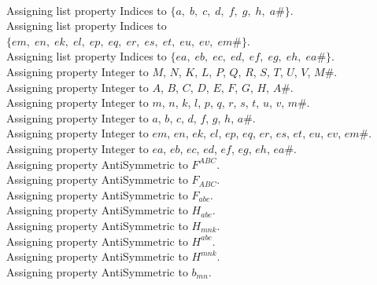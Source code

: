 \documentclass[11pt]{article}
\begin{document}
\\
Assigning list property Indices to $\{a,\; b,\; c,\; d,\; f,\; g,\; h,\; a\#\}$.
\\
Assigning list property Indices to $\{em,\; en,\; ek,\; el,\; ep,\; eq,\; er,\; es,\; et,\; eu,\; ev,\; em\#\}$.
\\
Assigning list property Indices to $\{ea,\; eb,\; ec,\; ed,\; ef,\; eg,\; eh,\; ea\#\}$.
\\
Assigning property Integer to $M$, $N$, $K$, $L$, $P$, $Q$, $R$, $S$, $T$, $U$, $V$, $M\#$.
\\
Assigning property Integer to $A$, $B$, $C$, $D$, $E$, $F$, $G$, $H$, $A\#$.
\\
Assigning property Integer to $m$, $n$, $k$, $l$, $p$, $q$, $r$, $s$, $t$, $u$, $v$, $m\#$.
\\
Assigning property Integer to $a$, $b$, $c$, $d$, $f$, $g$, $h$, $a\#$.
\\
Assigning property Integer to $em$, $en$, $ek$, $el$, $ep$, $eq$, $er$, $es$, $et$, $eu$, $ev$, $em\#$.
\\
Assigning property Integer to $ea$, $eb$, $ec$, $ed$, $ef$, $eg$, $eh$, $ea\#$.
\\
Assigning property AntiSymmetric to ${F}^{A B C}$.
\\
Assigning property AntiSymmetric to ${F}_{A B C}$.
\\
Assigning property AntiSymmetric to ${F}_{a b c}$.
\\
Assigning property AntiSymmetric to ${H}_{a b c}$.
\\
Assigning property AntiSymmetric to ${H}_{m n k}$.
\\
Assigning property AntiSymmetric to ${H}^{a b c}$.
\\
Assigning property AntiSymmetric to ${H}^{m n k}$.
\\
Assigning property AntiSymmetric to ${b}_{m n}$.
\\
\end{document}
